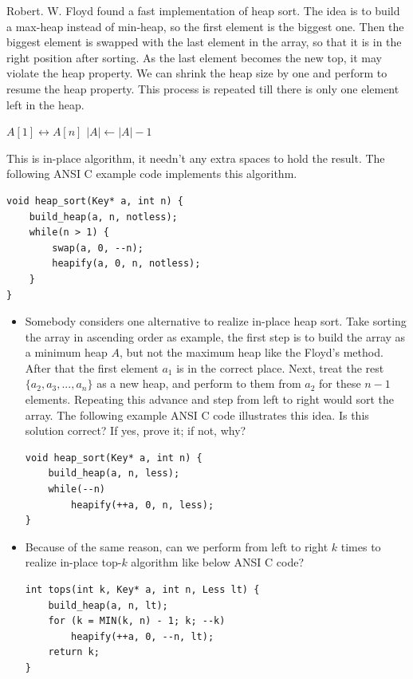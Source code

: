 \documentclass[b5paper]{article}
\begin{document}
Robert. W. Floyd found a fast implementation of heap sort.
The idea is to build a max-heap instead of min-heap, so the first
element is the biggest one. Then the biggest element is swapped
with the last element in the array, so that it is in the right
position after sorting. As the last element becomes the new top,
it may violate the heap property. We can shrink the heap size
by one and perform
 to resume the heap property.
This process
is repeated till there is only one element left in the heap.

\begin{algorithmic}[1]
  \State {}
    \State {} $A[1] \leftrightarrow A[n]$
    \State $|A| \gets |A| - 1$
    \State {}
  \EndWhile
\EndFunction
\end{algorithmic}

This is in-place algorithm, it needn't any extra spaces to hold
the result. The following ANSI C example code
implements this algorithm.

\lstset{language=C}
\begin{lstlisting}
void heap_sort(Key* a, int n) {
    build_heap(a, n, notless);
    while(n > 1) {
        swap(a, 0, --n);
        heapify(a, 0, n, notless);
    }
}
\end{lstlisting}

\begin{Exercise}
\begin{itemize}
\item Somebody considers one alternative to realize in-place heap sort. Take
sorting the array in ascending order as example, the first step is to build
the array as a minimum heap $A$, but not the maximum heap like the Floyd's method.
After that the first element $a_1$ is in the correct place. Next, treat
the rest $\{a_2, a_3, ..., a_n\}$ as a new heap, and perform
 to them from $a_2$ for these $n-1$ elements. Repeating this
advance and  step from left to right would sort the array.
The following example ANSI C code illustrates this idea.
Is this solution correct? If yes, prove it; if not, why?
\lstset{language=C}
\begin{lstlisting}
void heap_sort(Key* a, int n) {
    build_heap(a, n, less);
    while(--n)
        heapify(++a, 0, n, less);
}
\end{lstlisting}

\item Because of the same reason, can we perform  from
left to right $k$ times to realize in-place top-$k$ algorithm like below
ANSI C code?
\lstset{language=C}
\begin{lstlisting}
int tops(int k, Key* a, int n, Less lt) {
    build_heap(a, n, lt);
    for (k = MIN(k, n) - 1; k; --k)
        heapify(++a, 0, --n, lt);
    return k;
}
\end{lstlisting}
\end{itemize}
\end{Exercise}
\end{document}
